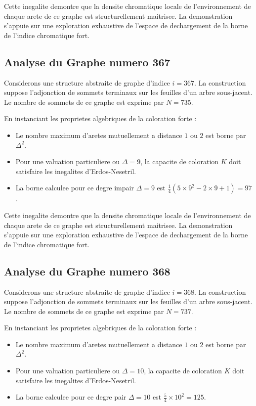 \documentclass[11pt,a4paper]{article}
\begin{document}
Cette inegalite demontre que la densite chromatique locale de l'environnement de chaque arete de ce graphe est structurellement maitrisee. La demonstration s'appuie sur une exploration exhaustive de l'espace de dechargement de la borne de l'indice chromatique fort.

\subsection{Analyse du Graphe numero 367}
Considerons une structure abstraite de graphe d'indice $i = 367$. La construction suppose l'adjonction de sommets terminaux sur les feuilles d'un arbre sous-jacent. Le nombre de sommets de ce graphe est exprime par $N = 735$.

En instanciant les proprietes algebriques de la coloration forte :
\begin{itemize}
\item Le nombre maximum d'aretes mutuellement a distance $1$ ou $2$ est borne par $\Delta^2$.
\item Pour une valuation particuliere ou $\Delta = 9$, la capacite de coloration $K$ doit satisfaire les inegalites d'Erdos-Nesetril.
\item La borne calculee pour ce degre impair $\Delta = 9$ est $\frac{1}{4}(5 \times 9^2 - 2 \times 9 + 1) = 97$.
\end{itemize}

Cette inegalite demontre que la densite chromatique locale de l'environnement de chaque arete de ce graphe est structurellement maitrisee. La demonstration s'appuie sur une exploration exhaustive de l'espace de dechargement de la borne de l'indice chromatique fort.

\subsection{Analyse du Graphe numero 368}
Considerons une structure abstraite de graphe d'indice $i = 368$. La construction suppose l'adjonction de sommets terminaux sur les feuilles d'un arbre sous-jacent. Le nombre de sommets de ce graphe est exprime par $N = 737$.

En instanciant les proprietes algebriques de la coloration forte :
\begin{itemize}
\item Le nombre maximum d'aretes mutuellement a distance $1$ ou $2$ est borne par $\Delta^2$.
\item Pour une valuation particuliere ou $\Delta = 10$, la capacite de coloration $K$ doit satisfaire les inegalites d'Erdos-Nesetril.
\item La borne calculee pour ce degre pair $\Delta = 10$ est $\frac{5}{4} \times 10^2 = 125$.
\end{itemize}
\end{document}
